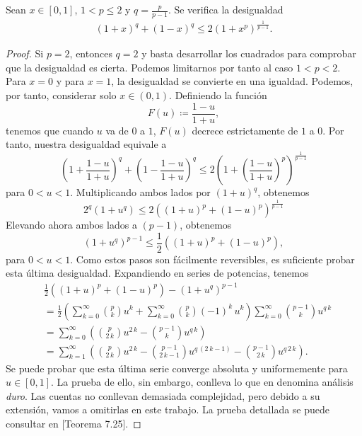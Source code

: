 \begin{lemma} \label{lema:clarkson-3}
    Sean $ x \in [0, 1] $, $ 1 < p \leq 2 $ y $ q = \frac{p}{p-1} $. Se verifica la desigualdad
    \begin{align} \label{eq:clarkson-3}
        (1+x)^q + (1-x)^q \leq 2(1+x^p)^\frac{1}{p-1}.
    \end{align}
\end{lemma}
\begin{proof}
    Si $ p = 2 $, entonces $ q = 2 $ y basta desarrollar los cuadrados para comprobar que la desigualdad es cierta. Podemos limitarnos por tanto al caso $ 1 < p < 2 $. Para $ x = 0 $ y para $ x = 1 $, la desigualdad se convierte en una igualdad. Podemos, por tanto, considerar solo $ x \in (0, 1) $. Definiendo la función
    \begin{equation}
        F(u) \coloneq \frac{1 - u}{1 + u},
    \end{equation}
    tenemos que cuando $ u $ va de $0$ a $1$, $ F(u) $ decrece estrictamente de $1$ a $0$. Por tanto, nuestra desigualdad equivale a 
    \begin{equation}
        \left(1 + \frac{1 - u}{1 + u}\right)^q + \left(1 - \frac{1 - u}{1 + u}\right)^q \leq 2 \left( 1 + \left( \frac{1 - u}{1 + u} \right)^p \right)^{\frac{1}{p-1}}
    \end{equation}
    para $ 0 < u < 1 $. Multiplicando ambos lados por $ (1 + u)^q $, obtenemos
    \begin{equation}
        2^q (1 + u^q) \leq 2 \left( (1 + u)^p + (1 - u)^p \right)^{\frac{1}{p-1}}
    \end{equation}
    Elevando ahora ambos lados a $ (p - 1) $, obtenemos
    \begin{equation}
        (1 + u^q)^{p-1} \leq \frac{1}{2} \left( (1 + u)^p + (1 - u)^p \right),
    \end{equation}
    para $ 0 < u < 1 $. Como estos pasos son fácilmente reversibles, es suficiente probar esta última desigualdad. Expandiendo en series de potencias, tenemos
    \begin{align}
        &\frac{1}{2}\left((1+u)^{p}+(1-u)^{p}\right)-(1+u^{q})^{p-1} \\
        &= \frac{1}{2}\left(\sum_{k=0}^{\infty}\binom{p}{k}u^{k}+\sum_{k=0}^{\infty}\binom{p}{k}(-1)^{k}\,u^{k}\right)\sum_{k=0}^{\infty}\binom{p-1}{k}u^{q\,k} \\
        &= \sum_{k=0}^{\infty}\left(\binom{p}{2\,k}u^{2\,k}-\binom{p-1}{k}u^{q\,k}\right) \\
        &= \sum_{k=1}^{\infty}\left(\binom{p}{2\,k}u^{2\,k} - \binom{p-1}{2\,k-1}u^{q\,(2\,k-1)}-\binom{p-1}{2\,k}u^{q\,2\,k}\right).
    \end{align}
    Se puede probar que esta última serie converge absoluta y uniformemente para $ u \in [0, 1] $. La prueba de ello, sin embargo, conlleva lo que en \cite{hewitt} denomina análisis {\it duro}. Las cuentas no conllevan demasiada complejidad, pero debido a su extensión, vamos a omitirlas en este trabajo. La prueba detallada se puede consultar en \cite{hewitt}[Teorema 7.25].
    

\end{proof}
